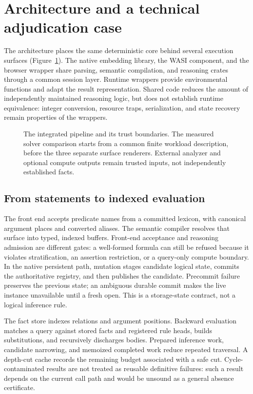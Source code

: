 \section{Architecture and a technical adjudication case}
\label{sec:architecture}

The architecture places the same deterministic core behind several execution
surfaces (Figure~\ref{fig:architecture}). The native embedding library,
the WASI component, and the browser wrapper share parsing, semantic compilation,
and reasoning crates through a common session layer. Runtime wrappers provide
environmental functions and adapt the result representation. Shared code reduces
the amount of independently maintained reasoning logic, but does not establish
runtime equivalence: integer conversion, resource traps, serialization, and
state recovery remain properties of the wrappers.

\begin{figure}[t]
\centering

\caption{The integrated pipeline and its trust boundaries. The measured solver
comparison starts from a common finite workload description, before the three
separate surface renderers. External analyzer and optional compute outputs
remain trusted inputs, not independently established facts.}
\label{fig:architecture}
\end{figure}

\subsection{From statements to indexed evaluation}

The front end accepts predicate names from a committed lexicon, with canonical
argument places and converted aliases. The semantic compiler resolves that
surface into typed, indexed buffers. Front-end acceptance and reasoning admission
are different gates: a well-formed formula can still be refused because it
violates stratification, an assertion restriction, or a query-only compute
boundary. In the native persistent path, mutation stages candidate logical
state, commits the authoritative registry, and then publishes the candidate.
Precommit failure preserves the previous state; an ambiguous durable commit
makes the live instance unavailable until a fresh open. This is a storage-state
contract, not a logical inference rule.

The fact store indexes relations and argument positions. Backward evaluation
matches a query against stored facts and registered rule heads, builds
substitutions, and recursively discharges bodies. Prepared inference work,
candidate narrowing, and memoized completed work reduce repeated traversal.
A depth-cut cache records the remaining budget associated with a safe cut.
Cycle-contaminated results are not treated as reusable definitive failures:
such a result depends on the current call path and would be unsound as a
general absence certificate.


